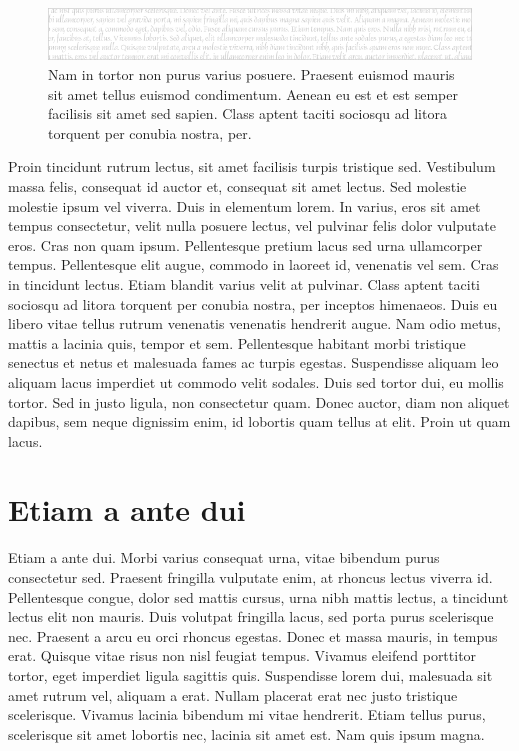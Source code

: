 \begin{figure}[t]
  \centering
  \includegraphics[width=\linewidth]{figs/leaderboard-white}
  \caption[Nam in tortor]{
    Nam in tortor non purus varius posuere.
Praesent euismod mauris sit amet tellus euismod condimentum.
Aenean eu est et est semper facilisis sit amet sed sapien.
Class aptent taciti sociosqu ad litora torquent per conubia nostra, per.
  }
\end{figure}

Proin tincidunt rutrum lectus, sit amet facilisis turpis tristique sed.
Vestibulum massa felis, consequat id auctor et, consequat sit amet lectus.
Sed molestie molestie ipsum vel viverra.
Duis in elementum lorem.
In varius, eros sit amet tempus consectetur, velit nulla posuere lectus, vel pulvinar felis dolor vulputate eros.
Cras non quam ipsum.
Pellentesque pretium lacus sed urna ullamcorper tempus.
Pellentesque elit augue, commodo in laoreet id, venenatis vel sem.
Cras in tincidunt lectus.
Etiam blandit varius velit at pulvinar.
Class aptent taciti sociosqu ad litora torquent per conubia nostra, per inceptos himenaeos.
Duis eu libero vitae tellus rutrum venenatis venenatis hendrerit augue.
Nam odio metus, mattis a lacinia quis, tempor et sem.
Pellentesque habitant morbi tristique senectus et netus et malesuada fames ac turpis egestas.
Suspendisse aliquam leo aliquam lacus imperdiet ut commodo velit sodales.
Duis sed tortor dui, eu mollis tortor.
Sed in justo ligula, non consectetur quam.
Donec auctor, diam non aliquet dapibus, sem neque dignissim enim, id lobortis quam tellus at elit.
Proin ut quam lacus.

\section{Etiam a ante dui}
Etiam a ante dui.
Morbi varius consequat urna, vitae bibendum purus consectetur sed.
Praesent fringilla vulputate enim, at rhoncus lectus viverra id.
Pellentesque congue, dolor sed mattis cursus, urna nibh mattis lectus, a tincidunt lectus elit non mauris.
Duis volutpat fringilla lacus, sed porta purus scelerisque nec.
Praesent a arcu eu orci rhoncus egestas.
Donec et massa mauris, in tempus erat.
Quisque vitae risus non nisl feugiat tempus.
Vivamus eleifend porttitor tortor, eget imperdiet ligula sagittis quis.
Suspendisse lorem dui, malesuada sit amet rutrum vel, aliquam a erat.
Nullam placerat erat nec justo tristique scelerisque.
Vivamus lacinia bibendum mi vitae hendrerit.
Etiam tellus purus, scelerisque sit amet lobortis nec, lacinia sit amet est.
Nam quis ipsum magna.

